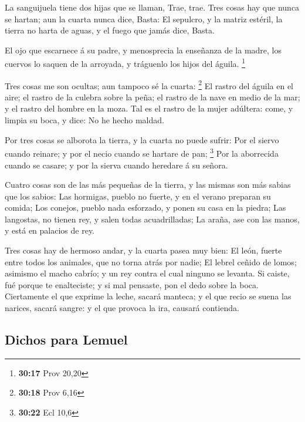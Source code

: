  La sanguijuela tiene dos hijas que se llaman, Trae, trae.
Tres cosas hay que nunca se hartan; aun la cuarta nunca dice, Basta:
 El sepulcro, y la matriz estéril, la tierra no harta de
aguas, y el fuego que jamás dice, Basta.

 El ojo que escarnece á su padre, y menosprecia la
enseñanza de la madre, los cuervos lo saquen de la arroyada, y tráguenlo
los hijos del águila. \footnote{\textbf{30:17} Prov 20,20}

 Tres cosas me son ocultas; aun tampoco sé la cuarta:
\footnote{\textbf{30:18} Prov 6,16}  El rastro del águila
en el aire; el rastro de la culebra sobre la peña; el rastro de la nave
en medio de la mar; y el rastro del hombre en la moza.  Tal
es el rastro de la mujer adúltera: come, y limpia su boca, y dice: No he
hecho maldad.

 Por tres cosas se alborota la tierra, y la cuarta no puede
sufrir:  Por el siervo cuando reinare; y por el necio
cuando se hartare de pan; \footnote{\textbf{30:22} Ecl 10,6}
 Por la aborrecida cuando se casare; y por la sierva cuando
heredare á su señora.

 Cuatro cosas son de las más pequeñas de la tierra, y las
mismas son más sabias que los sabios:  Las hormigas, pueblo
no fuerte, y en el verano preparan su comida;  Los conejos,
pueblo nada esforzado, y ponen su casa en la piedra;  Las
langostas, no tienen rey, y salen todas acuadrilladas;  La
araña, ase con las manos, y está en palacios de rey.

 Tres cosas hay de hermoso andar, y la cuarta pasea muy
bien:  El león, fuerte entre todos los animales, que no
torna atrás por nadie;  El lebrel ceñido de lomos; asimismo
el macho cabrío; y un rey contra el cual ninguno se levanta.
 Si caiste, fué porque te enalteciste; y si mal pensaste,
pon el dedo sobre la boca.  Ciertamente el que exprime la
leche, sacará manteca; y el que recio se suena las narices, sacará
sangre: y el que provoca la ira, causará contienda.

\hypertarget{dichos-para-lemuel}{%
\subsection{Dichos para Lemuel}\label{dichos-para-lemuel}}

